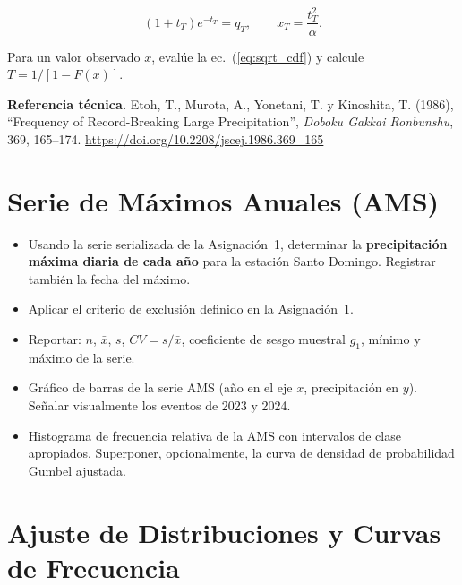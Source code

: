 \documentclass[11pt]{article}
\begin{document}
\begin{equation}
 (1+t_T)e^{-t_T}=q_T, \qquad x_T=\frac{t_T^2}{\alpha}.
 \label{eq:sqrt_quantile}
\end{equation}

Para un valor observado $x$, evalúe la ec.~(\ref{eq:sqrt_cdf}) y calcule
$T=1/[1-F(x)]$.

\begin{olivebox}
\textbf{Referencia técnica.} Etoh, T., Murota, A., Yonetani, T. y Kinoshita,
T. (1986), ``Frequency of Record-Breaking Large Precipitation'',
\emph{Doboku Gakkai Ronbunshu}, 369, 165--174.
\url{https://doi.org/10.2208/jscej.1986.369_165}
\end{olivebox}

\section{Serie de Máximos Anuales (AMS)}


\begin{itemize}
  \item Usando la serie serializada de la Asignación~1, determinar la
    \textbf{precipitación máxima diaria de cada año} para la estación Santo Domingo.
    Registrar también la fecha del máximo.
  \item Aplicar el criterio de exclusión definido en la Asignación~1.
  \item Reportar: $n$, $\bar{x}$, $s$, $CV = s/\bar{x}$, coeficiente de sesgo
    muestral $g_1$, mínimo y máximo de la serie.
\end{itemize}


\begin{itemize}
  \item Gráfico de barras de la serie AMS (año en el eje $x$, precipitación en $y$).
    Señalar visualmente los eventos de 2023 y 2024.
  \item Histograma de frecuencia relativa de la AMS con intervalos de clase apropiados.
    Superponer, opcionalmente, la curva de densidad de probabilidad Gumbel ajustada.
\end{itemize}

\section{Ajuste de Distribuciones y Curvas de Frecuencia}
\end{document}
